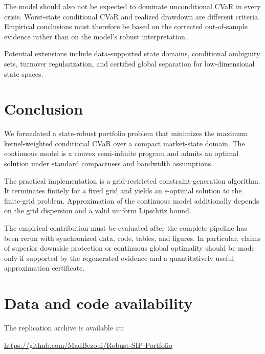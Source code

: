 \documentclass[11pt,a4paper]{article}
\theoremstyle{definition}
\theoremstyle{remark}
\begin{document}
The model should also not be expected to dominate unconditional CVaR in every
crisis. Worst-state conditional CVaR and realized drawdown are different
criteria. Empirical conclusions must therefore be based on the corrected
out-of-sample evidence rather than on the model's robust interpretation.

Potential extensions include data-supported state domains, conditional
ambiguity sets, turnover regularization, and certified global separation for
low-dimensional state spaces.

\section{Conclusion}

We formulated a state-robust portfolio problem that minimizes the maximum
kernel-weighted conditional CVaR over a compact market-state domain. The
continuous model is a convex semi-infinite program and admits an optimal
solution under standard compactness and bandwidth assumptions.

The practical implementation is a grid-restricted constraint-generation
algorithm. It terminates finitely for a fixed grid and yields an
\(\epsilon\)-optimal solution to the finite-grid problem. Approximation of the
continuous model additionally depends on the grid dispersion and a valid
uniform Lipschitz bound.

The empirical contribution must be evaluated after the complete pipeline has
been rerun with synchronized data, code, tables, and figures. In particular,
claims of superior downside protection or continuous global optimality should
be made only if supported by the regenerated evidence and a quantitatively
useful approximation certificate.

\section*{Data and code availability}

The replication archive is available at:

\begin{center}
\url{https://github.com/MadBezoui/Robust-SIP-Portfolio}
\end{center}
\end{document}
